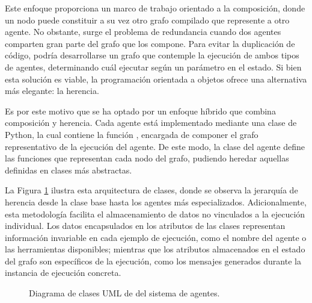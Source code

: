 Este enfoque proporciona un marco de trabajo orientado a la composición, donde un nodo puede constituir a su vez otro grafo compilado que represente a otro agente. No obstante, surge el problema de redundancia cuando dos agentes comparten gran parte del grafo que los compone. Para evitar la duplicación de código, podría desarrollarse un grafo que contemple la ejecución de ambos tipos de agentes, determinando cuál ejecutar según un parámetro en el estado. Si bien esta solución es viable, la programación orientada a objetos ofrece una alternativa más elegante: la herencia.

Es por este motivo que se ha optado por un enfoque híbrido que combina composición y herencia. Cada agente está implementado mediante una clase de Python, la cual contiene la función , encargada de componer el grafo representativo de la ejecución del agente. De este modo, la clase del agente define las funciones que representan cada nodo del grafo, pudiendo heredar aquellas definidas en clases más abstractas.

La Figura \ref{fig:uml} ilustra esta arquitectura de clases, donde se observa la jerarquía de herencia desde la clase base  hasta los agentes más especializados. Adicionalmente, esta metodología facilita el almacenamiento de datos no vinculados a la ejecución individual. Los datos encapsulados en los atributos de las clases representan información invariable en cada ejemplo de ejecución, como el nombre del agente o las herramientas disponibles; mientras que los atributos almacenados en el estado del grafo son específicos de la ejecución, como los mensajes generados durante la instancia de ejecución concreta.

\begin{figure}[p]
  \centering
  \caption{Diagrama de clases UML de del sistema de agentes.}
  \label{fig:uml}
\end{figure}

